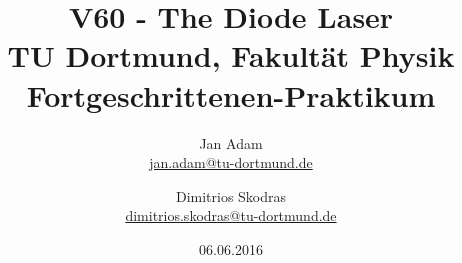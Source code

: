 



\title{V60 - The Diode Laser\\				%
	\large TU Dortmund, Fakultät Physik\\ 
	\normalsize Fortgeschrittenen-Praktikum}

\author{Jan Adam\\			%
	{\small \href{jan.adam@tu-dortmund.de}{jan.adam@tu-dortmund.de}}	%
	\and						%
	Dimitrios Skodras\\					%
	{\small \href{dimitrios.skodras@tu-dortmund.de}{dimitrios.skodras@tu-dortmund.de}}		%
}
\date{06.06.2016}				%



	

\maketitle					%
\thispagestyle{empty} 				%



\tableofcontents


\newpage					%


